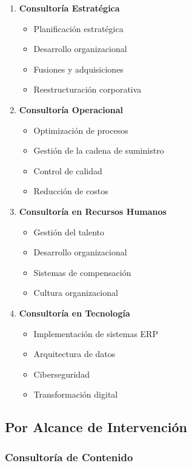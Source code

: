 \documentclass[12pt,letterpaper,oneside]{book}
\begin{document}
\begin{enumerate}
\item \textbf{Consultoría Estratégica}
   \begin{itemize}
   \item Planificación estratégica
   \item Desarrollo organizacional
   \item Fusiones y adquisiciones
   \item Reestructuración corporativa
   \end{itemize}

\item \textbf{Consultoría Operacional}
   \begin{itemize}
   \item Optimización de procesos
   \item Gestión de la cadena de suministro
   \item Control de calidad
   \item Reducción de costos
   \end{itemize}

\item \textbf{Consultoría en Recursos Humanos}
   \begin{itemize}
   \item Gestión del talento
   \item Desarrollo organizacional
   \item Sistemas de compensación
   \item Cultura organizacional
   \end{itemize}

\item \textbf{Consultoría en Tecnología}
   \begin{itemize}
   \item Implementación de sistemas ERP
   \item Arquitectura de datos
   \item Ciberseguridad
   \item Transformación digital
   \end{itemize}
\end{enumerate}

\subsection{Por Alcance de Intervención}

\subsubsection{Consultoría de Contenido}
\end{document}
